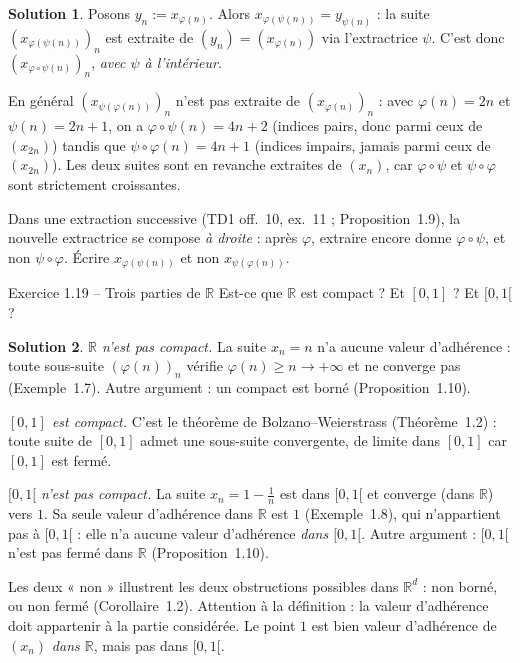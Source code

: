 \documentclass[11pt,a4paper]{article}
\newcommand{\R}{\mathbb{R}}
\theoremstyle{definition}
\newtheorem*{solution}{Solution}
\begin{document}
\begin{solution}
Posons $y_n:=x_{\varphi(n)}$. Alors $x_{\varphi(\psi(n))}=y_{\psi(n)}$ : la suite $(x_{\varphi(\psi(n))})_n$ est extraite de $(y_n)=(x_{\varphi(n)})$ via l'extractrice $\psi$. C'est donc $(x_{\varphi\circ\psi(n)})_n$, \emph{avec $\psi$ à l'intérieur}.

En général $(x_{\psi(\varphi(n))})_n$ n'est pas extraite de $(x_{\varphi(n)})_n$ : avec $\varphi(n)=2n$ et $\psi(n)=2n+1$, on a $\varphi\circ\psi(n)=4n+2$ (indices pairs, donc parmi ceux de $(x_{2n})$) tandis que $\psi\circ\varphi(n)=4n+1$ (indices impairs, jamais parmi ceux de $(x_{2n})$). Les deux suites sont en revanche extraites de $(x_n)$, car $\varphi\circ\psi$ et $\psi\circ\varphi$ sont strictement croissantes.
\end{solution}

\begin{piege}
Dans une extraction successive (TD1 off.~10, ex.~11 ; Proposition~1.9), la nouvelle extractrice se compose \emph{à droite} : après $\varphi$, extraire encore donne $\varphi\circ\psi$, et non $\psi\circ\varphi$. Écrire $x_{\varphi(\psi(n))}$ et non $x_{\psi(\varphi(n))}$.
\end{piege}

\begin{exo}{Exercice 1.19 -- Trois parties de $\R$}
Est-ce que $\R$ est compact ? Et $[0,1]$ ? Et $[0,1[$ ?
\end{exo}

\begin{solution}
\emph{$\R$ n'est pas compact.} La suite $x_n=n$ n'a aucune valeur d'adhérence : toute sous-suite $(\varphi(n))_n$ vérifie $\varphi(n)\ge n\to+\infty$ et ne converge pas (Exemple~1.7). Autre argument : un compact est borné (Proposition~1.10).

\emph{$[0,1]$ est compact.} C'est le théorème de Bolzano--Weierstrass (Théorème~1.2) : toute suite de $[0,1]$ admet une sous-suite convergente, de limite dans $[0,1]$ car $[0,1]$ est fermé.

\emph{$[0,1[$ n'est pas compact.} La suite $x_n=1-\frac1n$ est dans $[0,1[$ et converge (dans $\R$) vers $1$. Sa seule valeur d'adhérence dans $\R$ est $1$ (Exemple~1.8), qui n'appartient pas à $[0,1[$ : elle n'a aucune valeur d'adhérence \emph{dans $[0,1[$}. Autre argument : $[0,1[$ n'est pas fermé dans $\R$ (Proposition~1.10).
\end{solution}

\begin{commentaire}
Les deux « non » illustrent les deux obstructions possibles dans $\R^d$ : non borné, ou non fermé (Corollaire~1.2). Attention à la définition : la valeur d'adhérence doit appartenir à la partie considérée. Le point $1$ est bien valeur d'adhérence de $(x_n)$ \emph{dans $\R$}, mais pas dans $[0,1[$.
\end{commentaire}
\end{document}
